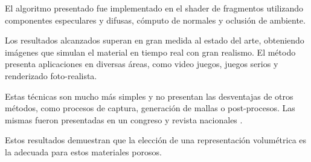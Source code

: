El algoritmo presentado fue implementado en el shader de fragmentos utilizando componentes especulares y difusas, cómputo de normales y oclusión de ambiente.

Los resultados alcanzados superan en gran medida al estado del arte, obteniendo imágenes que simulan el material en tiempo real con gran realismo.
El método presenta aplicaciones en diversas áreas, como video juegos, juegos serios \cite{Susi2007} y renderizado foto-realista.

Estas técnicas son mucho más simples y no presentan las desventajas de otros métodos, como procesos de captura, generación de mallas o post-procesos.
Las mismas fueron presentadas en un congreso y revista nacionales \cite{Baravalle2014}.

Estos resultados demuestran que la elección de una representación volumétrica es la adecuada para estos materiales porosos.



